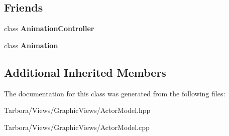 \subsection*{Friends}
\begin{DoxyCompactItemize}
\item 
\mbox{\label{classTarbora_1_1ActorModel_a7899599edce4988a894c8e7431e7bb85}} 
class {\bfseries Animation\+Controller}
\item 
\mbox{\label{classTarbora_1_1ActorModel_af47625f50036c466946f960db7320bcf}} 
class {\bfseries Animation}
\end{DoxyCompactItemize}
\subsection*{Additional Inherited Members}


The documentation for this class was generated from the following files\+:\begin{DoxyCompactItemize}
\item 
Tarbora/\+Views/\+Graphic\+Views/Actor\+Model.\+hpp\item 
Tarbora/\+Views/\+Graphic\+Views/Actor\+Model.\+cpp\end{DoxyCompactItemize}
